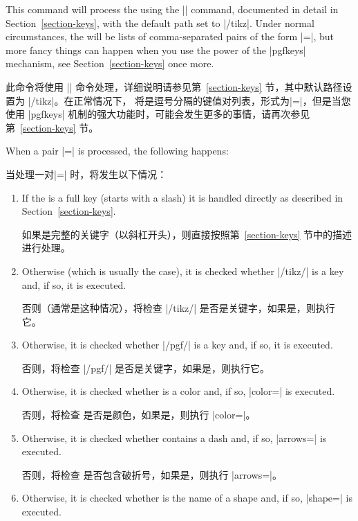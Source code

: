\begin{command}{\tikzset{}}
  This command will process the  using the |\pgfkeys| command,
  documented in detail in Section~\ref{section-keys}, with the default path
  set to |/tikz|. Under normal circumstances, the  will be
  lists of comma-separated pairs of the form |=|, but
  more fancy things can happen when you use the power of the |pgfkeys|
  mechanism, see Section~\ref{section-keys} once more.

  此命令将使用 |\pgfkeys| 命令处理，详细说明请参见第~\ref{section-keys} 节，其中默认路径设置为 |/tikz|。在正常情况下， 将是逗号分隔的键值对列表，形式为|=|，但是当您使用 |pgfkeys| 机制的强大功能时，可能会发生更多的事情，请再次参见第~\ref{section-keys} 节。


  When a pair |=| is processed, the following happens:
  
  当处理一对|=| 时，将发生以下情况：
%
  \begin{enumerate}
      \item If the  is a full key (starts with a slash) it is
          handled directly as described in Section~\ref{section-keys}.

          如果是完整的关键字（以斜杠开头），则直接按照第~\ref{section-keys} 节中的描述进行处理。
      \item Otherwise (which is usually the case), it is checked whether
          |/tikz/| is a key and, if so, it is executed.

          否则（通常是这种情况），将检查 |/tikz/| 是否是关键字，如果是，则执行它。
      \item Otherwise, it is checked whether |/pgf/| is a key
          and, if so, it is executed.

          否则，将检查 |/pgf/| 是否是关键字，如果是，则执行它。
      \item Otherwise, it is checked whether  is a color and, if
          so, |color=| is executed.

          否则，将检查 是否是颜色，如果是，则执行 |color=|。
      \item Otherwise, it is checked whether  contains a dash
          and, if so, |arrows=| is executed.

          否则，将检查 是否包含破折号，如果是，则执行 |arrows=|。
      \item Otherwise, it is checked whether  is the name of a
          shape and, if so, |shape=| is executed.


\end{enumerate}
\end{command}
